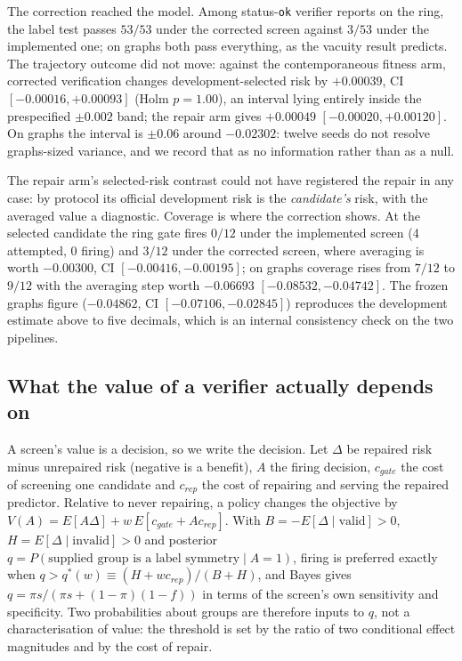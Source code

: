 \documentclass{neurips_2024}
\begin{document}
The correction reached the model. Among status-\texttt{ok} verifier reports on the ring, the label
test passes $53/53$ under the corrected screen against $3/53$ under the implemented one; on graphs
both pass everything, as the vacuity result predicts. The trajectory outcome did not move: against
the contemporaneous fitness arm, corrected verification changes development-selected risk by
$+0.00039$, CI $[-0.00016,+0.00093]$ (Holm $p{=}1.00$), an interval lying entirely inside the
prespecified $\pm0.002$ band; the repair arm gives $+0.00049$
$[-0.00020,+0.00120]$. On graphs the interval is $\pm0.06$ around $-0.02302$: twelve seeds do not
resolve graphs-sized variance, and we record that as no information rather than as a null.

The repair arm's selected-risk contrast could not have registered the repair in any case: by
protocol its official development risk is the \emph{candidate's} risk, with the averaged value a
diagnostic. Coverage is where the correction shows. At the selected candidate the ring gate fires
$0/12$ under the implemented screen (4 attempted, 0 firing) and $3/12$ under the corrected screen,
where averaging is worth $-0.00300$, CI $[-0.00416,-0.00195]$; on graphs coverage rises from $7/12$
to $9/12$ with the averaging step worth $-0.06693$ $[-0.08532,-0.04742]$. The frozen graphs figure
($-0.04862$, CI $[-0.07106,-0.02845]$) reproduces the development estimate above to five decimals,
which is an internal consistency check on the two pipelines.

\subsection{What the value of a verifier actually depends on}
\label{sec:decisionmodel}

A screen's value is a decision, so we write the decision. Let $\Delta$ be repaired risk minus
unrepaired risk (negative is a benefit), $A$ the firing decision, $c_{gate}$ the cost of screening
one candidate and $c_{rep}$ the cost of repairing and serving the repaired predictor. Relative to
never repairing, a policy changes the objective by $V(A) = E[A\Delta] + w\,E[c_{gate} + A c_{rep}]$.
With $B = -E[\Delta \mid \text{valid}] > 0$, $H = E[\Delta \mid \text{invalid}] > 0$ and posterior
$q = P(\text{supplied group is a label symmetry} \mid A = 1)$, firing is preferred exactly when
$q > q^*(w) \equiv (H + w c_{rep})/(B + H)$, and Bayes gives $q = \pi s / (\pi s + (1-\pi)(1-f))$
in terms of the screen's own sensitivity and specificity. Two probabilities about groups are
therefore inputs to $q$, not a characterisation of value: the threshold is set by the ratio of two
conditional effect magnitudes and by the cost of repair.
\end{document}
